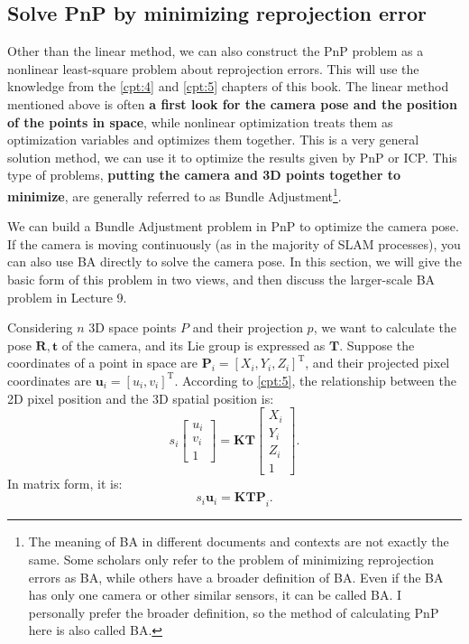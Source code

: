\subsection{Solve PnP by minimizing reprojection error}
\label{sec:BA-vo1}
Other than the linear method, we can also construct the PnP problem as a nonlinear least-square problem about reprojection errors. This will use the knowledge from the \ref{cpt:4} and \ref{cpt:5} chapters of this book. The linear method mentioned above is often \textbf{a first look for the camera pose and the position of the points in space}, while nonlinear optimization treats them as optimization variables and optimizes them together. This is a very general solution method, we can use it to optimize the results given by PnP or ICP. This type of problems, \textbf{putting the camera and 3D points together to minimize}, are generally referred to as Bundle Adjustment\footnote{The meaning of BA in different documents and contexts are not exactly the same. Some scholars only refer to the problem of minimizing reprojection errors as BA, while others have a broader definition of BA. Even if the BA has only one camera or other similar sensors, it can be called BA. I personally prefer the broader definition, so the method of calculating PnP here is also called BA.}.

We can build a Bundle Adjustment problem in PnP to optimize the camera pose. If the camera is moving continuously (as in the majority of SLAM processes), you can also use BA directly to solve the camera pose. In this section, we will give the basic form of this problem in two views, and then discuss the larger-scale BA problem in Lecture 9.

Considering $n$ 3D space points $P$ and their projection $p$, we want to calculate the pose $\bm{R}, \bm{t}$ of the camera, and its Lie group is expressed as $\bm{T}$. Suppose the coordinates of a point in space are $\bm{P}_i=[X_i,Y_i,Z_i]^\mathrm{T}$, and their projected pixel coordinates are $\bm{u}_i=[u_i,v_i]^ \mathrm{T}$. According to \ref{cpt:5}, the relationship between the 2D pixel position and the 3D spatial position is:
\begin{equation}
s_i \left[ 
\begin{array}{l}
u_i \\ v_i \\ 1
\end{array}
\right] = \bm{K} \bm{T} \left[ 
\begin{array}{l}
X_i \\ Y_i \\ Z_i \\ 1
\end{array} \right]  .
\end{equation}
In matrix form, it is:
\[
{{s_i {\bm{u}}_i} = \bm{K} \bm{T} \bm{P}}_i.
\]

